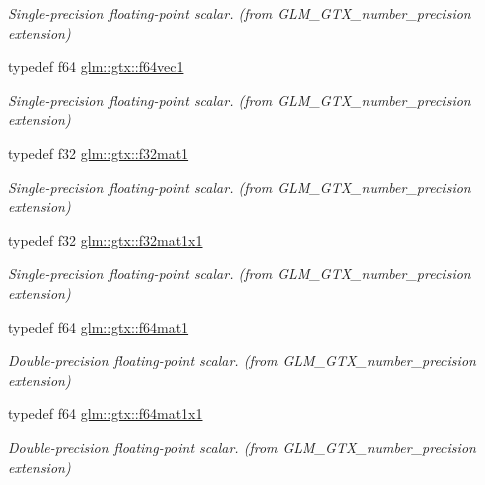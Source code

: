 \begin{DoxyCompactItemize}
\begin{DoxyCompactList}\small\item\em Single-\/precision floating-\/point scalar. (from G\+L\+M\+\_\+\+G\+T\+X\+\_\+number\+\_\+precision extension) \end{DoxyCompactList}\item 
typedef f64 \hyperlink{group__gtx__number__precision_ga44336a26c958d66efdfb5a6c114c538e}{glm\+::gtx\+::f64vec1}
\begin{DoxyCompactList}\small\item\em Single-\/precision floating-\/point scalar. (from G\+L\+M\+\_\+\+G\+T\+X\+\_\+number\+\_\+precision extension) \end{DoxyCompactList}\item 
typedef f32 \hyperlink{group__gtx__number__precision_gae5ff376ec910c360f06acc0c2b99260c}{glm\+::gtx\+::f32mat1}
\begin{DoxyCompactList}\small\item\em Single-\/precision floating-\/point scalar. (from G\+L\+M\+\_\+\+G\+T\+X\+\_\+number\+\_\+precision extension) \end{DoxyCompactList}\item 
typedef f32 \hyperlink{group__gtx__number__precision_ga01caec78388a82a9a22bd45e5751a38a}{glm\+::gtx\+::f32mat1x1}
\begin{DoxyCompactList}\small\item\em Single-\/precision floating-\/point scalar. (from G\+L\+M\+\_\+\+G\+T\+X\+\_\+number\+\_\+precision extension) \end{DoxyCompactList}\item 
typedef f64 \hyperlink{group__gtx__number__precision_ga23f8f53c78b50aa07a113c3d07d01bc9}{glm\+::gtx\+::f64mat1}
\begin{DoxyCompactList}\small\item\em Double-\/precision floating-\/point scalar. (from G\+L\+M\+\_\+\+G\+T\+X\+\_\+number\+\_\+precision extension) \end{DoxyCompactList}\item 
typedef f64 \hyperlink{group__gtx__number__precision_ga710a5952d78b22635c71c5fc2c0a3319}{glm\+::gtx\+::f64mat1x1}
\begin{DoxyCompactList}\small\item\em Double-\/precision floating-\/point scalar. (from G\+L\+M\+\_\+\+G\+T\+X\+\_\+number\+\_\+precision extension) \end{DoxyCompactList}\end{DoxyCompactItemize}


